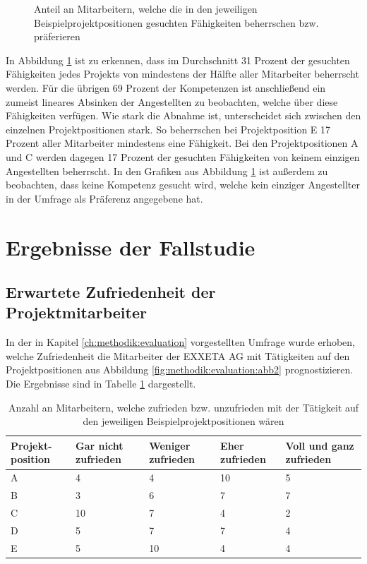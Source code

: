 \begin{figure}[h]
	\caption{Anteil an Mitarbeitern, welche die in den jeweiligen Beispielprojektpositionen gesuchten Fähigkeiten beherrschen bzw. präferieren}
\label{fig:ergebnisse:analyse:abb6}
\end{figure}

In Abbildung \ref{fig:ergebnisse:analyse:abb6} ist zu erkennen, dass im Durchschnitt 31 Prozent der gesuchten Fähigkeiten jedes Projekts von mindestens der Hälfte aller Mitarbeiter beherrscht werden. Für die übrigen 69 Prozent der Kompetenzen ist anschließend ein zumeist lineares Absinken der Angestellten zu beobachten, welche über diese Fähigkeiten verfügen. Wie stark die Abnahme ist, unterscheidet sich zwischen den einzelnen Projektpositionen stark. So beherrschen bei Projektposition E 17 Prozent aller Mitarbeiter mindestens eine Fähigkeit. Bei den Projektpositionen A und C werden dagegen 17 Prozent der gesuchten Fähigkeiten von keinem einzigen Angestellten beherrscht. In den Grafiken aus Abbildung \ref{fig:ergebnisse:analyse:abb6} ist außerdem zu beobachten, dass keine Kompetenz gesucht wird, welche kein einziger Angestellter in der Umfrage als Präferenz angegebene hat.

\section{Ergebnisse der Fallstudie}
\label{ch:ergebnisse:fallstudie}

\subsection{Erwartete Zufriedenheit der Projektmitarbeiter}
\label{ch:ergebnisse:fallstudie:umfrageMitarbeiter}
In der in Kapitel \ref{ch:methodik:evaluation} vorgestellten Umfrage wurde erhoben, welche Zufriedenheit die Mitarbeiter der EXXETA AG mit Tätigkeiten auf den Projektpositionen aus Abbildung \ref{fig:methodik:evaluation:abb2} prognostizieren. Die Ergebnisse sind in Tabelle \ref{tbl:ergebnisse:umfrageMitarbeiter:zufriedenheit:tbl1} dargestellt.%

\begin{table}[h]
	\centering
	\begin{tabularx}{\textwidth}{X|X|X|X|X}
		\textbf{Projekt-position} & \textbf{Gar nicht zufrieden} & \textbf{Weniger zufrieden} & \textbf{Eher zufrieden} & \textbf{Voll und ganz zufrieden}\\ 
		\hline
		A & 4  & 4  & 10 & 5\\
		B & 3  & 6  & 7  & 7\\
		C & 10 & 7  & 4  & 2\\
		D & 5  & 7  & 7  & 4\\
		E & 5  & 10 & 4  & 4
	\end{tabularx}
	\caption{Anzahl an Mitarbeitern, welche zufrieden bzw. unzufrieden mit der Tätigkeit auf den jeweiligen Beispielprojektpositionen wären}
	\label{tbl:ergebnisse:umfrageMitarbeiter:zufriedenheit:tbl1}
\end{table}

